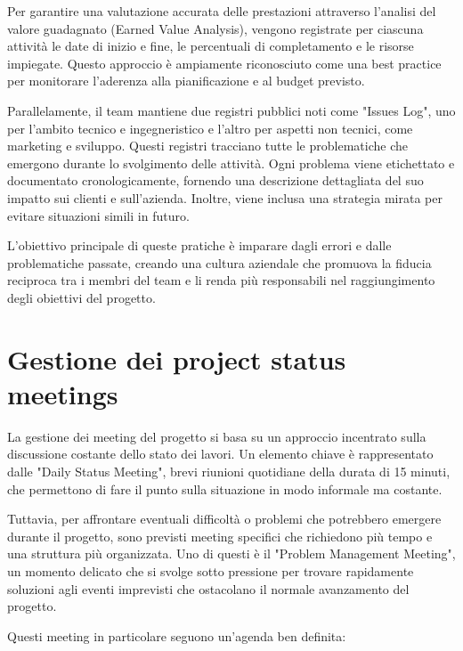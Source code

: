 \documentclass[oneside]{book}
\begin{document}
Per garantire una valutazione accurata delle prestazioni attraverso l'analisi del valore guadagnato (Earned Value Analysis), vengono registrate per ciascuna attività le date di inizio e fine, le percentuali di completamento e le risorse impiegate. Questo approccio è ampiamente riconosciuto come una best practice per monitorare l'aderenza alla pianificazione e al budget previsto.

Parallelamente, il team mantiene due registri pubblici noti come "Issues Log", uno per l'ambito tecnico e ingegneristico e l'altro per aspetti non tecnici, come marketing e sviluppo. Questi registri tracciano tutte le problematiche che emergono durante lo svolgimento delle attività. Ogni problema viene etichettato e documentato cronologicamente, fornendo una descrizione dettagliata del suo impatto sui clienti e sull'azienda. Inoltre, viene inclusa una strategia mirata per evitare situazioni simili in futuro.

L'obiettivo principale di queste pratiche è imparare dagli errori e dalle problematiche passate, creando una cultura aziendale che promuova la fiducia reciproca tra i membri del team e li renda più responsabili nel raggiungimento degli obiettivi del progetto.

\section{Gestione dei project status meetings}
La gestione dei meeting del progetto si basa su un approccio incentrato sulla discussione costante dello stato dei lavori. Un elemento chiave è rappresentato dalle "Daily Status Meeting", brevi riunioni quotidiane della durata di 15 minuti, che permettono di fare il punto sulla situazione in modo informale ma costante.

Tuttavia, per affrontare eventuali difficoltà o problemi che potrebbero emergere durante il progetto, sono previsti meeting specifici che richiedono più tempo e una struttura più organizzata. Uno di questi è il "Problem Management Meeting", un momento delicato che si svolge sotto pressione per trovare rapidamente soluzioni agli eventi imprevisti che ostacolano il normale avanzamento del progetto.

Questi meeting in particolare seguono un'agenda ben definita:
\end{document}
